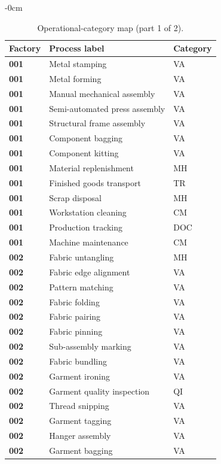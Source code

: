 \begin{table}[!t]\begin{adjustwidth}{-\extralength}{0cm}
\caption{Operational-category map (part 1 of 2).}\label{tab:mapping_1}
\small\renewcommand{\arraystretch}{0.96}\begin{tabularx}{\linewidth}{@{}l L l@{}}
\toprule Factory & Process label & Category \\ \midrule
\textbf{001} & Metal stamping & VA \\
\textbf{001} & Metal forming & VA \\
\textbf{001} & Manual mechanical assembly & VA \\
\textbf{001} & Semi-automated press assembly & VA \\
\textbf{001} & Structural frame assembly & VA \\
\textbf{001} & Component bagging & VA \\
\textbf{001} & Component kitting & VA \\
\textbf{001} & Material replenishment & MH \\
\textbf{001} & Finished goods transport & TR \\
\textbf{001} & Scrap disposal & MH \\
\textbf{001} & Workstation cleaning & CM \\
\textbf{001} & Production tracking & DOC \\
\textbf{001} & Machine maintenance & CM \\
\textbf{002} & Fabric untangling & MH \\
\textbf{002} & Fabric edge alignment & VA \\
\textbf{002} & Pattern matching & VA \\
\textbf{002} & Fabric folding & VA \\
\textbf{002} & Fabric pairing & VA \\
\textbf{002} & Fabric pinning & VA \\
\textbf{002} & Sub-assembly marking & VA \\
\textbf{002} & Fabric bundling & VA \\
\textbf{002} & Garment ironing & VA \\
\textbf{002} & Garment quality inspection & QI \\
\textbf{002} & Thread snipping & VA \\
\textbf{002} & Garment tagging & VA \\
\textbf{002} & Hanger assembly & VA \\
\textbf{002} & Garment bagging & VA \\

\end{tabularx}
\end{adjustwidth}
\end{table}

